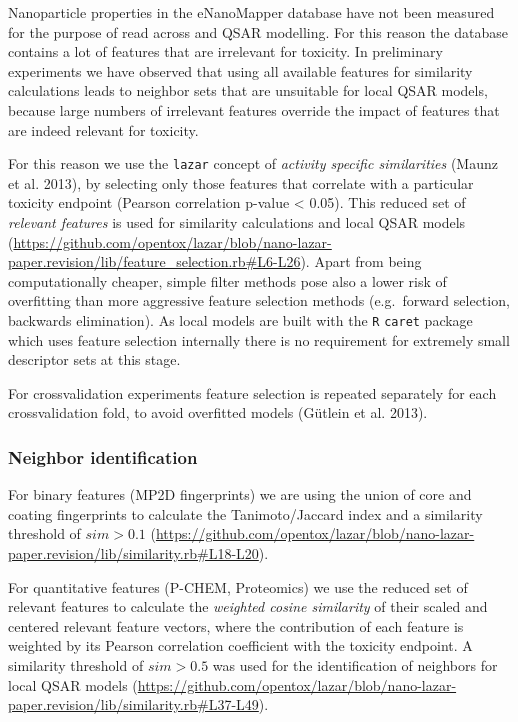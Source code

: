\documentclass[utf8]{frontiersHLTH} %
\begin{document}
Nanoparticle properties in the eNanoMapper database have not been
measured for the purpose of read across and QSAR modelling. For this
reason the database contains a lot of features that are irrelevant for
toxicity. In preliminary experiments we have observed that using all
available features for similarity calculations leads to neighbor sets
that are unsuitable for local QSAR models, because large numbers of
irrelevant features override the impact of features that are indeed
relevant for toxicity.

For this reason we use the \texttt{lazar} concept of \emph{activity
specific similarities} (Maunz et al. 2013), by selecting only those
features that correlate with a particular toxicity endpoint (Pearson
correlation p-value \textless{} 0.05). This reduced set of
\emph{relevant features} is used for similarity calculations and local
QSAR models
(\url{https://github.com/opentox/lazar/blob/nano-lazar-paper.revision/lib/feature_selection.rb\#L6-L26}).
Apart from being computationally cheaper, simple filter methods pose
also a lower risk of overfitting than more aggressive feature selection
methods (e.g.~forward selection, backwards elimination). As local models
are built with the \texttt{R} \texttt{caret} package which uses feature
selection internally there is no requirement for extremely small
descriptor sets at this stage.

For crossvalidation experiments feature selection is repeated separately
for each crossvalidation fold, to avoid overfitted models (Gütlein et
al. 2013).

\subsubsection{Neighbor identification}\label{neighbor-identification}

For binary features (MP2D fingerprints) we are using the union of core
and coating fingerprints to calculate the Tanimoto/Jaccard index and a
similarity threshold of \(sim > 0.1\)
(\url{https://github.com/opentox/lazar/blob/nano-lazar-paper.revision/lib/similarity.rb\#L18-L20}).

For quantitative features (P-CHEM, Proteomics) we use the reduced set of
relevant features to calculate the \emph{weighted cosine similarity} of
their scaled and centered relevant feature vectors, where the
contribution of each feature is weighted by its Pearson correlation
coefficient with the toxicity endpoint. A similarity threshold of
\(sim > 0.5\) was used for the identification of neighbors for local
QSAR models
(\url{https://github.com/opentox/lazar/blob/nano-lazar-paper.revision/lib/similarity.rb\#L37-L49}).
\end{document}
